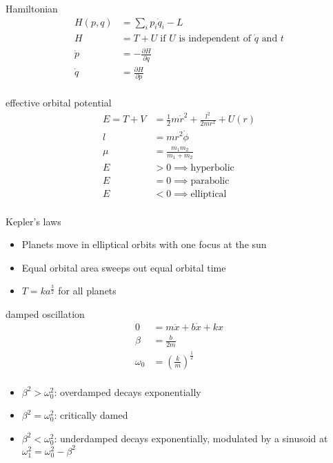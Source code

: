 \documentclass[avery5388, frame, grid]{flashcards}
\begin{document}
\begin{flashcard}{Hamiltonian}
  {
    \begin{align*}
      H(p, q) &= \sum_{i} p_{i} \dot{q}_{i} - L\\
      H &= T + U \; \textrm{if $U$ is independent of $\dot{q}$ and $t$}\\
      \dot{p} &= - \frac{\partial H}{\partial q}\\
      \dot{q} &= \frac{\partial H}{\partial p}\\
    \end{align*}
  }
\end{flashcard}

\begin{flashcard}{effective orbital potential}
  {
    \begin{align*}
      E = T + V &= \frac{1}{2} m \dot{r}^{2} + \frac{l^2}{2 m r^{2}} + U(r)\\
      l &= m r^{2} \dot{\phi}\\
      \mu &= \frac{m_{1} m_{2}}{m_{1} + m_{2}}\\
      E &> 0 \implies \textrm{hyperbolic}\\
      E &= 0 \implies \textrm{parabolic}\\
      E &< 0 \implies \textrm{elliptical}\\
    \end{align*}
  }
\end{flashcard}

\begin{flashcard}{Kepler's laws}
  {
    \begin{itemize}
    \item Planets move in elliptical orbits with one focus at the sun
    \item Equal orbital area sweeps out equal orbital time
    \item $T = ka^{\frac{3}{2}}$ for all planets
    \end{itemize}
  }
\end{flashcard}

\begin{flashcard}{damped oscillation}
  {
    \begin{align*}
      0 &= m\ddot{x} + b\dot{x} + kx \\
      \beta &= \frac{b}{2m}\\
      \omega_{0} &= (\frac{k}{m})^{\frac{1}{2}}\\
    \end{align*}
  }
  {
    \begin{itemize}
    \item $\beta^{2} > \omega_{0}^{2}$: overdamped decays exponentially
    \item $\beta^{2} = \omega_{0}^{2}$: critically damed
    \item $\beta^{2} < \omega_{0}^{2}$: underdamped decays exponentially, modulated by a sinusoid at $\omega_{1}^{2} = \omega_{0}^{2} - \beta^{2}$
    \end{itemize}
  }
\end{flashcard}
\end{document}
